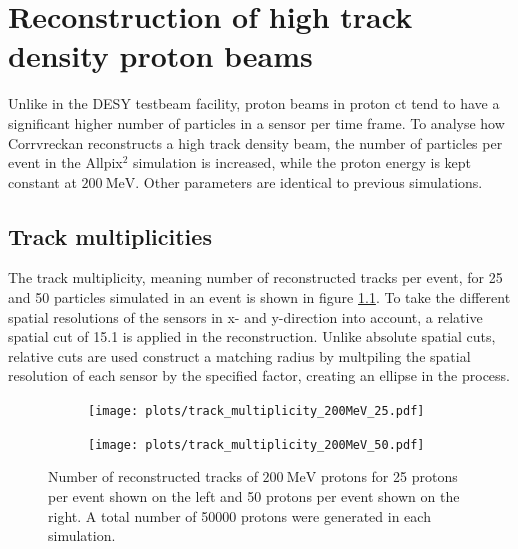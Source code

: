 \chapter{Reconstruction of high track density proton beams}\label{sec:density}
Unlike in the DESY testbeam facility, proton beams in proton ct tend to have a significant higher number of particles in a sensor
per time frame. To analyse how Corrvreckan reconstructs a high track density beam, the number of particles per event in the Allpix$^2$
simulation is increased, while the proton energy is kept constant at $\SI{200}{\mega\eV}$. Other parameters are identical to previous simulations.

\section{Track multiplicities}
The track multiplicity, meaning number of reconstructed tracks per event, for 25 and 50 particles simulated in an event is shown in figure \ref{fig:multiplicity}. To take the different spatial resolutions of the sensors in x- and y-direction into account, a relative
spatial cut of 15.1 is applied in the reconstruction. Unlike absolute spatial cuts, relative cuts are used construct a
matching radius by multpiling the spatial resolution
of each sensor by the specified factor, creating an ellipse in the process.

\begin{figure}
  \hspace{-2.5cm}
  \begin{subfigure}{0.62\textwidth}
      \centering
      \texttt{[image: plots/track\_multiplicity\_200MeV\_25.pdf]}
  \end{subfigure}
  \begin{subfigure}{0.62\textwidth}
      \hspace{0.95cm}
      \texttt{[image: plots/track\_multiplicity\_200MeV\_50.pdf]}
  \end{subfigure}
  \caption{Number of reconstructed tracks of $\SI{200}{\mega\eV}$ protons for 25 protons per event shown on the left and
  50 protons per event shown on the right. A total number of 50000 protons were generated in each simulation. }
  \label{fig:multiplicity}
\end{figure}

